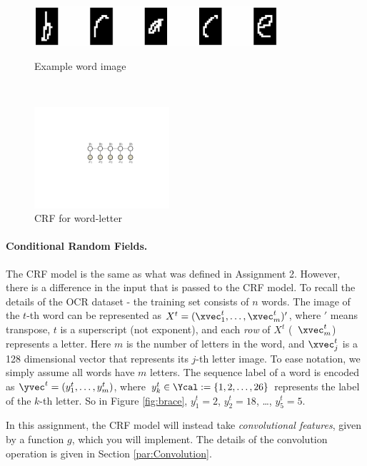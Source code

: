 \documentclass[11pt]{report}
\begin{document}
\begin{figure}[t!]
	\begin{minipage}[b]{0.62\textwidth}
		\centering \vspace{-0.6em} \includegraphics[width=9cm]{brace.jpg}
		\vspace{0.6em}
		\caption{Example word image}\label{fig:brace}
	\end{minipage}
	~~~
	\begin{minipage}[b]{0.33\textwidth}
		\centering \includegraphics[width=5cm]{crf}
		\caption{CRF for word-letter}\label{fig:CRF_model}
	\end{minipage}
\end{figure}

\paragraph{Conditional Random Fields.}
\label{sec:Condtional_Random_Fields}

The CRF model is the same as what was defined in Assignment 2. However, there is
a difference in the input that is passed to the CRF model. To recall the details
of the OCR dataset - the training set consists of $n$ words. The image of the
$t$-th word can be represented as $X^t = (\xvec^t_1, \ldots, \xvec^t_m)'$, where
$'$ means transpose, $t$ is a superscript (not exponent), and each \emph{row} of
$X^t$ (\eg\ $\xvec^t_m$) represents a letter. Here $m$ is the number of letters
in the word, and $\xvec^t_j$ is a 128 dimensional vector that represents its
$j$-th letter image. To ease notation, we simply assume all words have $m$
letters. The sequence label of a word is encoded as $\yvec^t = (y^t_1, \ldots,
y^t_m)$, where $y^t_k \in \Ycal := \{1, 2, \ldots, 26\}$ represents the label of
the $k$-th letter. So in Figure \ref{fig:brace}, $y^t_1 = 2$, $y^t_2 = 18$,
\ldots, $y^t_5 = 5$.

In this assignment, the CRF model will instead take \emph{convolutional
  features}, given by a function $g$, which you will implement. The details of
the convolution operation is given in Section \ref{par:Convolution}.
\end{document}
